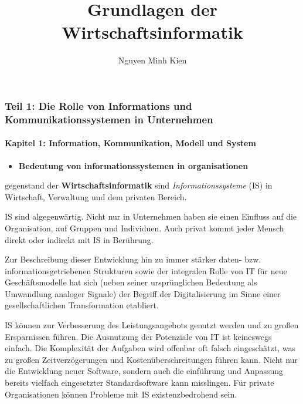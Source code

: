 \documentclass[]{article}
\title{Grundlagen der Wirtschaftsinformatik}
\author{Nguyen Minh Kien}
\date{}
\providecommand{\tightlist}{%
  \setlength{\itemsep}{0pt}\setlength{\parskip}{0pt}}
\let\oldparagraph\paragraph
\renewcommand{\paragraph}[1]{\oldparagraph{#1}\mbox{}}
\begin{document}
\maketitle

\hypertarget{teil-1-die-rolle-von-informations-und-kommunikationssystemen-in-unternehmen}{%
\subsubsection{Teil 1: Die Rolle von Informations und
Kommunikationssystemen in
Unternehmen}\label{teil-1-die-rolle-von-informations-und-kommunikationssystemen-in-unternehmen}}

\hypertarget{kapitel-1-information-kommunikation-modell-und-system}{%
\paragraph{Kapitel 1: Information, Kommunikation, Modell und
System}\label{kapitel-1-information-kommunikation-modell-und-system}}

\begin{itemize}
\tightlist
\item
  \textbf{Bedeutung von informationssystemen in organisationen}
\end{itemize}

gegenstand der \textbf{Wirtschaftsinformatik} sind
\emph{Informationssysteme} (IS) in Wirtschaft, Verwaltung und dem
privaten Bereich.

IS sind algegenwärtig. Nicht nur in Unternehmen haben sie einen Einfluss
auf die Organisation, auf Gruppen und Individuen. Auch privat kommt
jeder Mensch direkt oder indirekt mit IS in Berührung.

Zur Beschreibung dieser Entwicklung hin zu immer stärker daten- bzw.
informationsgetriebenen Strukturen sowie der integralen Rolle von IT für
neue Geschäftsmodelle hat sich (neben seiner ursprünglichen Bedeutung
als Umwandlung analoger Signale) der Begriff der Digitalisierung im
Sinne einer gesellschaftlichen Transformation etabliert.

IS können zur Verbesserung des Leistungsangebots genutzt werden und zu
großen Ersparnissen führen. Die Ausnutzung der Potenziale von IT ist
keineswegs einfach. Die Komplexität der Aufgaben wird offenbar oft
falsch eingeschätzt, was zu großen Zeitverzögerungen und
Kostenüberschreitungen führen kann. Nicht nur die Entwicklung neuer
Software, sondern auch die einführung und Anpassung bereits vielfach
eingesetzter Standardsoftware kann misslingen. Für private
Organisationen können Probleme mit IS existenzbedrohend sein.
\end{document}
